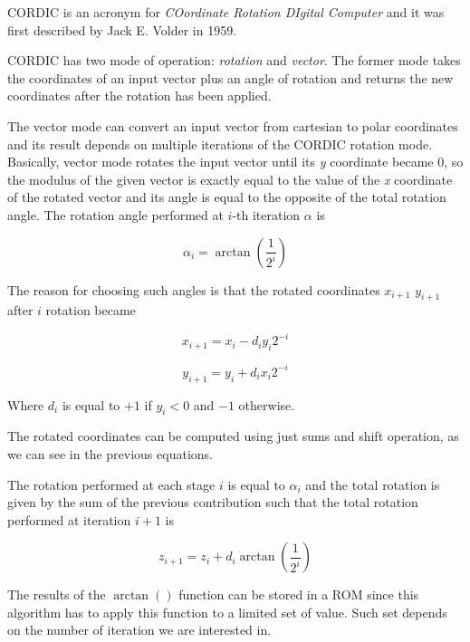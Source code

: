 \documentclass[12pt,a4paper]{report}
\begin{document}
CORDIC is an acronym for \emph{COordinate Rotation DIgital Computer} and it was first described by Jack E. Volder in 1959.

CORDIC has two mode of operation: \emph{rotation} and \emph{vector}. The former mode takes the coordinates of an input vector plus an angle of rotation and returns the new coordinates after the rotation has been applied.

The vector mode can convert an input vector from cartesian to polar coordinates and its result depends on multiple iterations of the CORDIC rotation mode. Basically, vector mode rotates the input vector until its \emph{y} coordinate became 0, so the modulus of the given vector is exactly equal to the value of the \emph{x} coordinate of the rotated vector and its angle is equal to the opposite of the total rotation angle.\newline
The rotation angle performed at $i$-th iteration $\alpha$ is

\begin{equation}
\alpha_{i} = \arctan \left(\dfrac{1}{2^i}\right)
\end{equation}

The reason for choosing such angles is that the rotated coordinates $x_{i+1}$ $y_{i+1}$  after $i$ rotation became

\begin{equation}
x_{i+1} = x_{i} - d_{i} y_{i}  2^{-i}
\end{equation}

\begin{equation}
y_{i+1} = y_{i} + d_{i} x_{i} 2^{-i}
\end{equation}

Where $d_{i}$ is equal to $+1$ if $y_{i} < 0$ and $-1$ otherwise.

The rotated coordinates can be computed using just sums and shift operation, as we can see in the previous equations.

The rotation performed at each stage $i$ is equal to $\alpha_{i}$ and the total rotation is given by the sum of the previous contribution such that the total rotation performed at iteration $i+1$ is

\begin{equation}
z_{i+1} = z_{i} + d_{i} \arctan \left(\dfrac{1}{2^i}\right)
\end{equation}

The results of the $\arctan()$ function can be stored in a ROM since this algorithm has to apply this function to a limited set of value. Such set depends on the number of iteration we are interested in.
\end{document}
